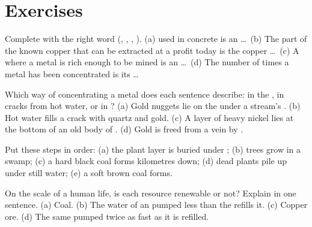 \section{Exercises}

\begin{exercise}[$\star$]\label{exo:g9:earth-resources:1}
Complete with the right word (, , ,
). (a)  used in concrete is an \ldots\ (b) The part of the known
copper that can be extracted at a profit today is the copper \ldots\ (c) A
 where a metal is rich enough to be mined is an \ldots\ (d) The number
of times a metal has been concentrated is its \ldots
\end{exercise}

\begin{exercise}[$\star$]\label{exo:g9:earth-resources:2}
Which way of concentrating a metal does each sentence describe: in the
, in cracks from hot water, or in  ? (a) Gold nuggets lie
on the  under a stream's . (b) Hot water fills a crack with
quartz and gold. (c) A layer of heavy nickel  lies at the bottom of
an old body of . (d) Gold is freed from a vein by .
\end{exercise}

\begin{exercise}[$\star$]\label{exo:g9:earth-resources:3}
Put these steps in order: (a) the plant layer is buried under  ;
(b) trees grow in a swamp; (c) a hard black coal forms kilometres down;
(d) dead plants pile up under still water; (e) a soft brown coal forms.
\end{exercise}

\begin{exercise}[$\star$]\label{exo:g9:earth-resources:4}
On the scale of a human life, is each resource renewable or not? Explain in
one sentence. (a) Coal. (b) The water of an  pumped less than the
 refills it. (c) Copper ore. (d) The same  pumped twice as fast
as it is refilled.
\end{exercise}

